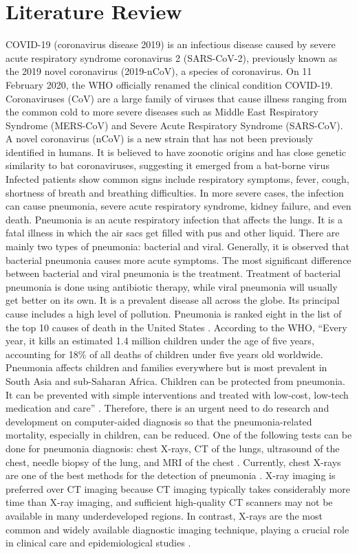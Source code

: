 \documentclass[a4paper,12pt]{report}
\begin{document}
\chapter{Literature Review}
COVID-19 (coronavirus disease 2019) is an infectious disease caused by severe acute respiratory syndrome coronavirus 2 (SARS-CoV-2), previously known as the 2019 novel coronavirus (2019-nCoV), a species of coronavirus. On 11 February 2020, the WHO officially renamed the clinical condition COVID-19.
Coronaviruses (CoV) are a large family of viruses that cause illness ranging from the common cold to more severe diseases such as Middle East Respiratory Syndrome (MERS-CoV) and Severe Acute Respiratory Syndrome (SARS-CoV). A novel coronavirus (nCoV) is a new strain that has not been previously identified in humans.
It is believed to have zoonotic origins and has close genetic similarity to bat coronaviruses, suggesting it emerged from a bat-borne virus
Infected patients show common signs include respiratory symptoms, fever, cough, shortness of breath and breathing difficulties. In more severe cases, the infection can cause pneumonia, severe acute respiratory syndrome, kidney failure, and even death.
Pneumonia is an acute respiratory infection that affects the lungs. It is a fatal illness in which the air sacs get filled with pus and other liquid.\cite{ref1} There are mainly two types of pneumonia: bacterial and viral. Generally, it is observed that bacterial pneumonia causes more acute symptoms. The most significant difference between bacterial and viral pneumonia is the treatment. Treatment of bacterial pneumonia is done using antibiotic therapy, while viral pneumonia will usually get better on its own\cite{ref2}. It is a prevalent disease all across the globe. Its principal cause includes a high level of pollution. Pneumonia is ranked eight in the list of the top 10 causes of death in the United States \cite{ref4}.
According to the WHO, “Every year, it kills an estimated 1.4 million children under the age of five years, accounting for 18\% of all deaths of children under five years old worldwide. Pneumonia affects children and families everywhere but is most prevalent in South Asia and sub-Saharan Africa. Children can be protected from pneumonia. It can be prevented with simple interventions and treated with low-cost, low-tech medication and care” \cite{ref2}. Therefore, there is an urgent need to do research and development on computer-aided diagnosis so that the pneumonia-related mortality, especially in children, can be reduced.
One of the following tests can be done for pneumonia diagnosis: chest X-rays, CT of the lungs, ultrasound of the chest, needle biopsy of the lung, and MRI of the chest \cite{ref3}. Currently, chest X-rays are one of the best methods for the detection of pneumonia \cite{ref6}. X-ray imaging is preferred over CT imaging because CT imaging typically takes considerably more time than X-ray imaging, and sufficient high-quality CT scanners may not be available in many underdeveloped regions. In contrast, X-rays are the most common and widely available diagnostic imaging technique, playing a crucial role in clinical care and epidemiological studies \cite{ref5}.
\end{document}

